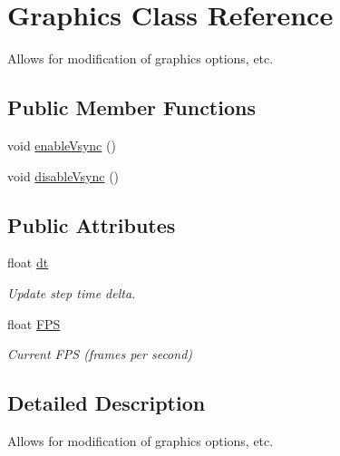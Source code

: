 \hypertarget{class_graphics}{\section{Graphics Class Reference}
\label{class_graphics}
}


Allows for modification of graphics options, etc.  


\subsection*{Public Member Functions}
\begin{DoxyCompactItemize}
\item 
void \hyperlink{class_graphics_ab3ce370405a25e84a1ff412bd47c884d}{enable\+Vsync} ()
\item 
void \hyperlink{class_graphics_ad3962ac13c18173b141f569794a96b26}{disable\+Vsync} ()
\end{DoxyCompactItemize}
\subsection*{Public Attributes}
\begin{DoxyCompactItemize}
\item 
\hypertarget{class_graphics_a778e38aa889751afffa2dea6b803e67a}{float \hyperlink{class_graphics_a778e38aa889751afffa2dea6b803e67a}{dt}}\label{class_graphics_a778e38aa889751afffa2dea6b803e67a}

\begin{DoxyCompactList}\small\item\em Update step time delta. \end{DoxyCompactList}\item 
\hypertarget{class_graphics_a4ce66cf70b6cf09c40e92fd9e6bcf046}{float \hyperlink{class_graphics_a4ce66cf70b6cf09c40e92fd9e6bcf046}{F\+P\+S}}\label{class_graphics_a4ce66cf70b6cf09c40e92fd9e6bcf046}

\begin{DoxyCompactList}\small\item\em Current F\+P\+S (frames per second) \end{DoxyCompactList}\end{DoxyCompactItemize}


\subsection{Detailed Description}
Allows for modification of graphics options, etc. 

